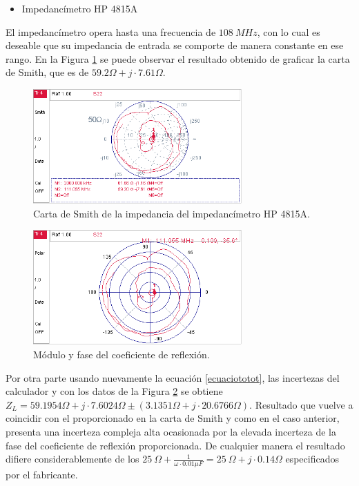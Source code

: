 \documentclass[a4paper,10pt]{article}
\begin{document}
		\begin{itemize}
			\item Impedanc\'imetro HP 4815A
		\end{itemize}
		
		\indent El impedanc\'imetro opera hasta una frecuencia de $108~MHz$, con
		lo cual es deseable que su impedancia de entrada se comporte de manera 
		constante en ese rango. En la Figura 
		\ref{tranferenciaimpedanciamiterro} se puede observar el resultado 
		obtenido de graficar la carta de Smith, que es de $59.2\Omega+j\cdot7.61\Omega$.
		
		\begin{figure}[!htb]
			\centering
			\includegraphics[width=8cm]
			{Imagenes/Smithimpedancaiimpedancimetro.png}
			\caption{Carta de Smith de la impedancia del impedanc\'imetro HP 
			4815A.}
			\label{tranferenciaimpedanciamiterro} 
		\end{figure}	
			
		\begin{figure}[!htb]
					\centering
					\includegraphics[width=8cm]
					{Imagenes/CoeficientereflexionIMPE.png}
					\caption{M\'odulo y fase del coeficiente de reflexi\'on.}
					\label{CoeficientereflexionIMPE} 
				\end{figure}
	Por otra parte usando nuevamente la ecuaci\'on \ref{ecuaciototot}, las incertezas del calculador y con los datos de la Figura \ref{CoeficientereflexionIMPE} se obtiene
	$Z_L =59.1954 \Omega + j\cdot 7.6024\Omega \pm (3.1351\Omega +j\cdot20.6766\Omega)$. Resultado que vuelve a coincidir con el proporcionado en la carta de Smith y como en el caso anterior, presenta una incerteza compleja alta ocasionada por la elevada incerteza de la fase del coeficiente de reflexi\'on proporcionada. De cualquier manera el resultado difiere considerablemente de los $25~\Omega+\frac{1}{\omega\cdot0.01\mu F}=25~\Omega+j\cdot0.14\Omega$ especificados por el fabricante.
	
\end{document}
